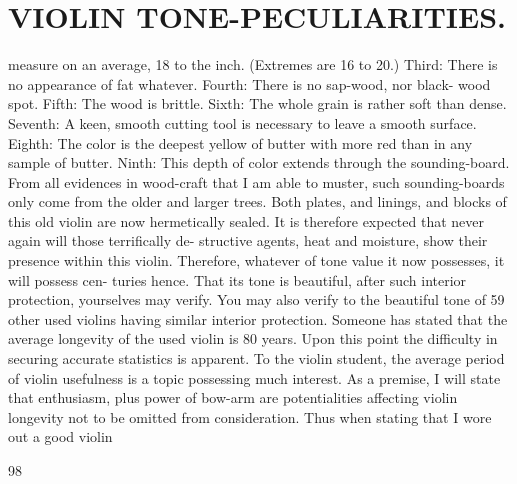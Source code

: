 \documentclass{article}
\begin{document}
\section*{VIOLIN TONE-PECULIARITIES.}
measure on an average, 18 to the inch. (Extremes are 16 to 20.) Third: There is no appearance of fat whatever. Fourth: There is no sap-wood, nor black- wood spot. Fifth: The wood is brittle. Sixth: The whole grain is rather soft than dense. Seventh: A keen, smooth cutting tool is necessary to leave a smooth surface. Eighth: The color is the deepest yellow of butter with more red than in any sample of butter. Ninth: This depth of color extends through the sounding-board. From all evidences in wood-craft that I am able to muster, such sounding-boards only come from the older and larger trees. Both plates, and linings, and blocks of this old violin are now hermetically sealed. It is therefore expected that never again will those terrifically de- structive agents, heat and moisture, show their presence within this violin. Therefore, whatever of tone value it now possesses, it will possess cen- turies hence. That its tone is beautiful, after such interior protection, yourselves may verify. You may also verify to the beautiful tone of 59 other used violins having similar interior protection. Someone has stated that the average longevity of the used violin is 80 years. Upon this point the difficulty in securing accurate statistics is apparent. To the violin student, the average period of violin usefulness is a topic possessing much interest. As a premise, I will state that enthusiasm, plus power of bow-arm are potentialities affecting violin longevity not to be omitted from consideration. Thus when stating that I wore out a good violin

98
\end{document}
